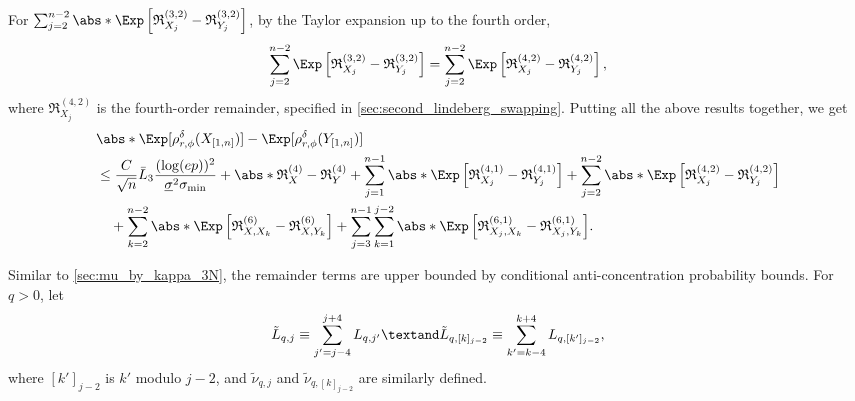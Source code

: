\documentclass[aos]{imsart}
\begin{document}
\begin{appendix}
For $\sum_{j=2}^{n-2} \abs*{ \Exp\left[ \mathfrak{R}_{X_j}^{(3,2)} - \mathfrak{R}_{Y_j}^{(3,2)} \right] }$, by the Taylor expansion up to the fourth order,
\begin{equation*}
    \sum_{j=2}^{n-2} \Exp\left[ \mathfrak{R}_{X_j}^{(3,2)} - \mathfrak{R}_{Y_j}^{(3,2)} \right]
    = \sum_{j=2}^{n-2} \Exp\left[ \mathfrak{R}_{X_j}^{(4,2)} - \mathfrak{R}_{Y_j}^{(4,2)} \right],
\end{equation*}
where $\mathfrak{R}_{X_j}^{(4,2)}$ is the fourth-order remainder, specified in \cref{sec:second_lindeberg_swapping}. 
Putting all the above results together, we get
\begin{equation} \label{eq:decompose_third_result_P}
\begin{aligned}
    & \abs*{ \Exp[\rho_{r,\phi}^\delta(X_{[1,n]})] - \Exp[\rho_{r,\phi}^\delta(Y_{[1,n]})]} \\
    & \leq \frac{C}{\sqrt{n}} \bar{L}_{3} \frac{(\log(ep))^2}{\underline\sigma^2 \sigma_{\min}}
    + \abs*{ \mathfrak{R}_X^{(4)} - \mathfrak{R}_Y^{(4)} }
    + \sum_{j=1}^{n-1} \abs*{ \Exp \left[ \mathfrak{R}_{X_j}^{(4,1)} 
        - \mathfrak{R}_{Y_j}^{(4,1)} \right] }
    + \sum_{j=2}^{n-2} \abs*{ \Exp\left[ \mathfrak{R}_{X_j}^{(4,2)} - \mathfrak{R}_{Y_j}^{(4,2)} \right] }\\
    & \quad + \sum_{k=2}^{n-2} \abs*{ \Exp \left[ 
        \mathfrak{R}_{X,X_k}^{(6)}
        - \mathfrak{R}_{X,Y_k}^{(6)}
    \right] }
    + \sum_{j=3}^{n-1} \sum_{k=1}^{j-2} \abs*{ \Exp \left[ 
        \mathfrak{R}_{X_j,X_k}^{(6,1)}
        - \mathfrak{R}_{X_j,Y_k}^{(6,1)}
    \right] }.
\end{aligned}
\end{equation}




\medskip
{} Similar to \cref{sec:mu_by_kappa_3N}, the remainder terms are upper bounded by conditional anti-concentration probability bounds. 
For $q > 0$, let
\begin{equation*}
    \tilde{L}_{q,j} \equiv \sum_{j'=j-4}^{j+4} L_{q,j'} \textand 
    \tilde{L}_{q,[k]_{j-2}} \equiv \sum_{k'=k-4}^{k+4} L_{q,[k']_{j-2}},
\end{equation*}
where $[k']_{j-2}$ is $k'$ modulo $j-2$, and $\tilde{\nu}_{q,j}$ and $\tilde{\nu}_{q,[k]_{j-2}}$ are similarly defined.


\end{appendix}
\end{document}
